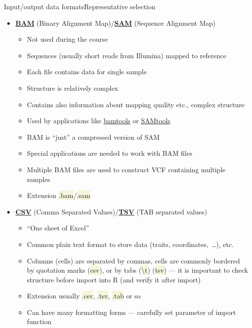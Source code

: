 \documentclass[compress, xelatex, 11pt, xcolor=svgnames, aspectratio=169, url={hyphens, lowtilde}]{beamer}
\renewcommand{\texttt}[1]{\colorbox{Beige}{{\ttfamily #1}}}
\begin{document}
\begin{frame}[allowframebreaks]{Input/output data formats}{Representative selection}
	\begin{itemize}
		\item \href{https://en.wikipedia.org/wiki/BAM_(file_format)}{\textbf{BAM}} (Binary Alignment Map)/\href{https://en.wikipedia.org/wiki/SAM_(file_format)}{\textbf{SAM}} (Sequence Alignment Map)
		\begin{itemize}
			\item Not used during the course
			\item Sequences (usually short reads from Illumina) mapped to reference
			\item Each file contains data for single sample
			\item Structure is relatively complex
			\item Contains also information about mapping quality etc., complex structure
			\item Used by applications like \href{https://github.com/pezmaster31/bamtools/wiki}{bamtools} or \href{https://www.htslib.org/}{SAMtools}
			\item BAM is \enquote{just} a compressed version of SAM
			\item Special applications are needed to work with BAM files
			\item Multiple BAM files are used to construct VCF containing multiple samples
			\item Extension \texttt{*.bam}/\texttt{*.sam}
		\end{itemize}
		\item \href{https://en.wikipedia.org/wiki/Comma-separated_values}{\textbf{CSV}} (Comma Separated Values)/\href{https://en.wikipedia.org/wiki/Tab-separated_values}{\textbf{TSV}} (TAB separated values)
		\begin{itemize}
			\item \enquote{One sheet of Excel}
			\item Common plain text format to store data (traits, coordinates,~\ldots), etc.
			\item Columns (cells) are separated by commas, cells are commonly bordered by quotation marks (\texttt{csv}), or by tabs (\texttt{\textbackslash t}) (\texttt{tsv}) --- it is important to check structure before import into R (and verify it after import)
			\item Extension usually \texttt{*.csv}, \texttt{*.tsv}, \texttt{*.tab} or so
			\item Can have many formatting forms --- carefully set parameter of import function

\end{itemize}
\end{itemize}
\end{frame}
\end{document}

